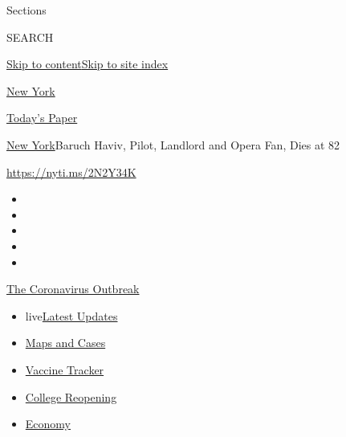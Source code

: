 Sections

SEARCH

\protect\hyperlink{site-content}{Skip to
content}\protect\hyperlink{site-index}{Skip to site index}

\href{https://www.nytimes3xbfgragh.onion/section/nyregion}{New York}

\href{https://myaccount.nytimes3xbfgragh.onion/auth/login?response_type=cookie\&client_id=vi}{}

\href{https://www.nytimes3xbfgragh.onion/section/todayspaper}{Today's
Paper}

\href{/section/nyregion}{New York}\textbar{}Baruch Haviv, Pilot,
Landlord and Opera Fan, Dies at 82

\url{https://nyti.ms/2N2Y34K}

\begin{itemize}
\item
\item
\item
\item
\item
\end{itemize}

\href{https://www.nytimes3xbfgragh.onion/news-event/coronavirus?action=click\&pgtype=Article\&state=default\&region=TOP_BANNER\&context=storylines_menu}{The
Coronavirus Outbreak}

\begin{itemize}
\tightlist
\item
  live\href{https://www.nytimes3xbfgragh.onion/2020/08/04/world/coronavirus-covid-19.html?action=click\&pgtype=Article\&state=default\&region=TOP_BANNER\&context=storylines_menu}{Latest
  Updates}
\item
  \href{https://www.nytimes3xbfgragh.onion/interactive/2020/us/coronavirus-us-cases.html?action=click\&pgtype=Article\&state=default\&region=TOP_BANNER\&context=storylines_menu}{Maps
  and Cases}
\item
  \href{https://www.nytimes3xbfgragh.onion/interactive/2020/science/coronavirus-vaccine-tracker.html?action=click\&pgtype=Article\&state=default\&region=TOP_BANNER\&context=storylines_menu}{Vaccine
  Tracker}
\item
  \href{https://www.nytimes3xbfgragh.onion/2020/08/02/us/covid-college-reopening.html?action=click\&pgtype=Article\&state=default\&region=TOP_BANNER\&context=storylines_menu}{College
  Reopening}
\item
  \href{https://www.nytimes3xbfgragh.onion/live/2020/08/03/business/stock-market-today-coronavirus?action=click\&pgtype=Article\&state=default\&region=TOP_BANNER\&context=storylines_menu}{Economy}
\end{itemize}

